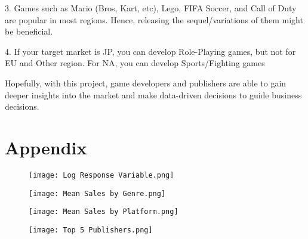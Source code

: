 \documentclass[12pt]{article}
\begin{document}
3. Games such as Mario (Bros, Kart, etc), Lego, FIFA Soccer, and Call of Duty are popular in most regions. Hence, releasing the sequel/variations of them might be beneficial.

4. If your target market is JP, you can develop Role-Playing games, but not for EU and Other region. For NA, you can develop Sports/Fighting games

Hopefully, with this project, game developers and publishers are able to gain deeper insights into the market and make data-driven decisions to guide business decisions.

\pagebreak
\section{Appendix}

\begin{figure}[h]
\centering
\begin{minipage}{.5\textwidth}
  \centering
  \texttt{[image: Log Response Variable.png]}
  \label{fig:qqlogsales}
\end{minipage}%
\begin{minipage}{.5\textwidth}
  \centering
  \texttt{[image: Mean Sales by Genre.png]}
  \label{fig:salesgenre}
\end{minipage}
\end{figure}

\begin{figure}[h]
\centering
\begin{minipage}{.5\textwidth}
  \centering
  \texttt{[image: Mean Sales by Platform.png]}
  \label{fig:salesplatform}
\end{minipage}%
\begin{minipage}{.5\textwidth}
  \centering
  \texttt{[image: Top 5 Publishers.png]}
  \label{fig:publishers}
\end{minipage}
\end{figure}
\end{document}
